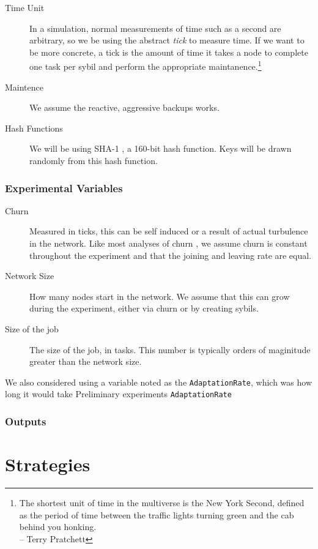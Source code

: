 \begin{description}
	\item [Time Unit] In a simulation, normal measurements of time such as a second are arbitrary, so we be using the abstract \textit{tick} to measure time.  
	If we want to be more concrete, a tick is the amount of time it takes a node to complete one task per sybil and perform the appropriate maintanence.\footnote{The shortest unit of time in the multiverse is the New York Second, defined as the period of time between the traffic lights turning green and the cab behind you honking.\\-- Terry Pratchett}
	\item [Maintence] We assume the reactive, aggressive backups works.
	\item [Hash Functions] We will be using SHA-1 \cite{sha1}, a 160-bit hash function.  
	Keys will be drawn randomly from this hash function.
\end{description}

\subsubsection{Experimental Variables}
\begin{description}
	\item [Churn] Measured in ticks, this can be self induced or a result of actual turbulence in the network.
	Like most analyses of churn \cite{marozzo2012p2p}, we assume churn is constant throughout the experiment and that the joining and leaving rate are equal.
	\item [Network Size]  How many nodes start in the network.  
		We assume that this can grow during the experiment, either via churn or by creating sybils.
	\item [Size of the job] The size of the job, in tasks.
		This number is typically orders of maginitude greater than the network size.
\end{description}

We also considered using a variable noted as the \texttt{AdaptationRate}, which was how long it would take
Preliminary experiments \texttt{AdaptationRate} 

\subsubsection{Outputs}



\section{Strategies}

